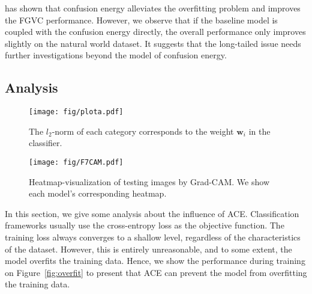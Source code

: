 \documentclass{article}
\begin{document}
\citet{dubey2018pairwise} has shown that confusion energy alleviates the overfitting problem and improves the FGVC performance. However, we observe that if the baseline model is coupled with the confusion energy directly, the overall performance only improves slightly on the natural world dataset. It suggests that the long-tailed issue needs further investigations beyond the model of confusion energy. 

\subsection{Analysis}


\begin{figure*}[t]
    \centering
    \vspace{-10pt}
    \caption{Observation of the overfitting issue. (a) and (b) shows that there is a large gap between training accuracy and validation performance. (c) presents ACE alleviates the overfitting issue and improves the validation performance.}
    \label{fig:overfit}
    \vspace{-10pt}
\end{figure*}

\begin{figure}[t!]
    \centering
    \texttt{[image: fig/plota.pdf]}
    \vspace{-15pt}
    \caption{The $l_2$-norm of each category corresponds to the weight $\mathbf{w}_i$ in the classifier.}
    \label{fig:w_norm}
    \vspace{-15pt}
\end{figure}

\begin{figure}[ht!]
    \centering
    \texttt{[image: fig/F7CAM.pdf]}
    \vspace{-15pt}
    \caption{Heatmap-visualization of testing images by Grad-CAM. We show each model's corresponding heatmap. 
    }
    \label{fig:cam}
    \vspace{-15pt}
\end{figure}

In this section, we give some analysis about the influence of ACE. Classification frameworks usually use the cross-entropy loss as the objective function. The training loss always converges to a shallow level, regardless of the characteristics of the dataset. However, this is entirely unreasonable, and to some extent, the model overfits the training data. Hence, we show the performance during training on Figure~\ref{fig:overfit} to present that ACE can prevent the model from overfitting the training data.
\end{document}
